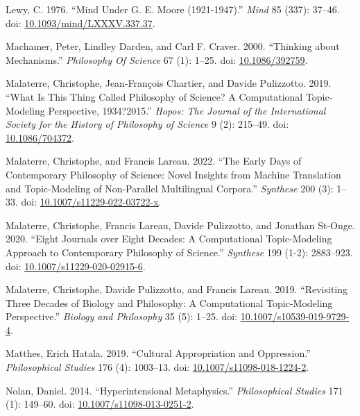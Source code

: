 \documentclass[
  10pt,
  letterpaper,
  DIV=11,
  numbers=noendperiod,
  twoside]{scrartcl}
\newlength{\cslhangindent}
\newenvironment{CSLReferences}[2] %
 {\begin{list}{}{%
  \setlength{\itemindent}{0pt}
  \setlength{\leftmargin}{0pt}
  \setlength{\parsep}{0pt}
  \ifodd #1
   \setlength{\leftmargin}{\cslhangindent}
   \setlength{\itemindent}{-1\cslhangindent}
  \fi
  \setlength{\itemsep}{#2\baselineskip}}}
 {\end{list}}
\begin{document}
\begin{CSLReferences}{1}{0}
Lewy, C. 1976. {``Mind Under {G. E. Moore} (1921-1947).''} \emph{Mind}
85 (337): 37--46. doi:
\href{https://doi.org/10.1093/mind/LXXXV.337.37}{10.1093/mind/LXXXV.337.37}.

Machamer, Peter, Lindley Darden, and Carl F. Craver. 2000. {``Thinking
about Mechanisms.''} \emph{Philosophy Of Science} 67 (1): 1--25. doi:
\href{https://doi.org/10.1086/392759}{10.1086/392759}.

Malaterre, Christophe, Jean-François Chartier, and Davide Pulizzotto.
2019. {``What Is This Thing Called Philosophy of Science? A
Computational Topic-Modeling Perspective, 1934?2015.''} \emph{Hopos: The
Journal of the International Society for the History of Philosophy of
Science} 9 (2): 215--49. doi:
\href{https://doi.org/10.1086/704372}{10.1086/704372}.

Malaterre, Christophe, and Francis Lareau. 2022. {``The Early Days of
Contemporary Philosophy of Science: Novel Insights from Machine
Translation and Topic-Modeling of Non-Parallel Multilingual Corpora.''}
\emph{Synthese} 200 (3): 1--33. doi:
\href{https://doi.org/10.1007/s11229-022-03722-x}{10.1007/s11229-022-03722-x}.

Malaterre, Christophe, Francis Lareau, Davide Pulizzotto, and Jonathan
St-Onge. 2020. {``Eight Journals over Eight Decades: A Computational
Topic-Modeling Approach to Contemporary Philosophy of Science.''}
\emph{Synthese} 199 (1-2): 2883--923. doi:
\href{https://doi.org/10.1007/s11229-020-02915-6}{10.1007/s11229-020-02915-6}.

Malaterre, Christophe, Davide Pulizzotto, and Francis Lareau. 2019.
{``Revisiting Three Decades of Biology and Philosophy: A Computational
Topic-Modeling Perspective.''} \emph{Biology and Philosophy} 35 (5):
1--25. doi:
\href{https://doi.org/10.1007/s10539-019-9729-4}{10.1007/s10539-019-9729-4}.

Matthes, Erich Hatala. 2019. {``Cultural Appropriation and
Oppression.''} \emph{Philosophical Studies} 176 (4): 1003--13. doi:
\href{https://doi.org/10.1007/s11098-018-1224-2}{10.1007/s11098-018-1224-2}.

Nolan, Daniel. 2014. {``Hyperintensional Metaphysics.''}
\emph{Philosophical Studies} 171 (1): 149--60. doi:
\href{https://doi.org/10.1007/s11098-013-0251-2}{10.1007/s11098-013-0251-2}.


\end{CSLReferences}
\end{document}
